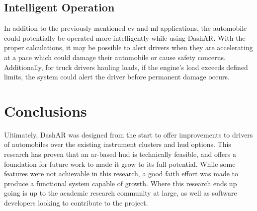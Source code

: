     \subsection{Intelligent Operation}
        \par In addition to the previously mentioned \gls{cv} and \gls{ml} applications, the automobile could potentially be operated more intelligently while using DashAR. With the proper calculations, it may be possible to alert drivers when they are accelerating at a pace which could damage their automobile or cause safety concerns. Additionally, for truck drivers hauling loads, if the engine's load exceeds defined limits, the system could alert the driver before permanent damage occurs.

\section{Conclusions}
    \par Ultimately, DashAR was designed from the start to offer improvements to drivers of automobiles over the existing instrument clusters and \gls{hud} options. This research has proven that an \gls{ar}-based \gls{hud} is technically feasible, and offers a foundation for future work to made it grow to its full potential. While some features were not achievable in this research, a good faith effort was made to produce a functional system capable of growth. Where this research ends up going is up to the academic research community at large, as well as software developers looking to contribute to the project.
